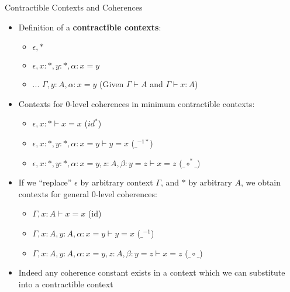 \documentclass[12pt, mathserif,handout]{beamer}
\begin{document}
\begin{frame}[allowframebreaks,t]{Contractible Contexts and Coherences}

\begin{itemize}

\item Definition of a \textbf{contractible contexts}:
\begin{itemize}
\item $\epsilon, * $
\item $\epsilon,x : *, y : *, \alpha : x = y$
\item ... $\Gamma, y: A , \alpha : x = y$ (Given $\Gamma \vdash A$ and
  $\Gamma \vdash x : A$)
\end{itemize}


\item Contexts for 0-level coherences in minimum contractible contexts:
\begin{itemize}
\item $\epsilon,x : * \vdash x = x$ ($id^{*}$)
\item $\epsilon,x : *, y : *, \alpha : x = y \vdash y = x$ ($\_^{-1*}$)
\item $\epsilon,x : *, y : *, \alpha : x = y, z: A,
  \beta : y = z \vdash x = z$ ($\_\circ^{*}\_$)
\end{itemize}

\item If we ``replace'' $\epsilon$ by arbitrary context $\Gamma$, and
  $*$ by arbitrary $A$, we obtain contexts for general 0-level coherences:
\begin{itemize}
\item $\Gamma,x : A \vdash x = x$ (id)
\item $\Gamma,x : A, y : A, \alpha : x = y \vdash y = x$ ($\_^{-1}$)
\item $\Gamma,x : A, y : A, \alpha : x = y, z: A,
  \beta : y = z \vdash x = z$ ($\_\circ\_$)
\end{itemize}

\item Indeed any coherence constant exists in a context which we can
  substitute into a contractible context


\end{itemize}
\end{frame}
\end{document}

